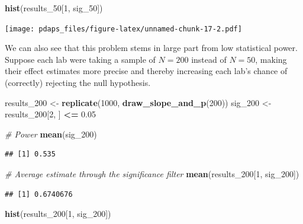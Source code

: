 \documentclass[12pt,oneside,openany]{book}
\newenvironment{Shaded}{\begin{snugshade}}{\end{snugshade}}
\newcommand{\KeywordTok}[1]{\textcolor[rgb]{0.13,0.29,0.53}{\textbf{#1}}}
\newcommand{\DecValTok}[1]{\textcolor[rgb]{0.00,0.00,0.81}{#1}}
\newcommand{\FloatTok}[1]{\textcolor[rgb]{0.00,0.00,0.81}{#1}}
\newcommand{\StringTok}[1]{\textcolor[rgb]{0.31,0.60,0.02}{#1}}
\newcommand{\CommentTok}[1]{\textcolor[rgb]{0.56,0.35,0.01}{\textit{#1}}}
\newcommand{\OperatorTok}[1]{\textcolor[rgb]{0.81,0.36,0.00}{\textbf{#1}}}
\newcommand{\NormalTok}[1]{#1}
\begin{document}
\begin{Shaded}
\begin{Highlighting}[]
\KeywordTok{hist}\NormalTok{(results_}\DecValTok{50}\NormalTok{[}\DecValTok{1}\NormalTok{, sig_}\DecValTok{50}\NormalTok{])}
\end{Highlighting}
\end{Shaded}

\texttt{[image: pdaps\_files/figure-latex/unnamed-chunk-17-2.pdf]}

We can also see that this problem stems in large part from low
statistical power. Suppose each lab were taking a sample of \(N = 200\)
instead of \(N = 50\), making their effect estimates more precise and
thereby increasing each lab's chance of (correctly) rejecting the null
hypothesis.

\begin{Shaded}
\begin{Highlighting}[]
\NormalTok{results_}\DecValTok{200}\NormalTok{ <-}\StringTok{ }\KeywordTok{replicate}\NormalTok{(}\DecValTok{1000}\NormalTok{, }\KeywordTok{draw_slope_and_p}\NormalTok{(}\DecValTok{200}\NormalTok{))}
\NormalTok{sig_}\DecValTok{200}\NormalTok{ <-}\StringTok{ }\NormalTok{results_}\DecValTok{200}\NormalTok{[}\DecValTok{2}\NormalTok{, ] }\OperatorTok{<=}\StringTok{ }\FloatTok{0.05}

\CommentTok{# Power}
\KeywordTok{mean}\NormalTok{(sig_}\DecValTok{200}\NormalTok{)}
\end{Highlighting}
\end{Shaded}

\begin{verbatim}
## [1] 0.535
\end{verbatim}

\begin{Shaded}
\begin{Highlighting}[]
\CommentTok{# Average estimate through the significance filter}
\KeywordTok{mean}\NormalTok{(results_}\DecValTok{200}\NormalTok{[}\DecValTok{1}\NormalTok{, sig_}\DecValTok{200}\NormalTok{])}
\end{Highlighting}
\end{Shaded}

\begin{verbatim}
## [1] 0.6740676
\end{verbatim}

\begin{Shaded}
\begin{Highlighting}[]
\KeywordTok{hist}\NormalTok{(results_}\DecValTok{200}\NormalTok{[}\DecValTok{1}\NormalTok{, sig_}\DecValTok{200}\NormalTok{])}
\end{Highlighting}
\end{Shaded}
\end{document}
